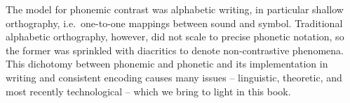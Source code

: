 The model for phonemic contrast was alphabetic writing, in particular shallow orthography, i.e.\ one-to-one mappings between sound and symbol. Traditional alphabetic orthography, however, did not scale to precise phonetic notation, so the former was sprinkled with diacritics to denote non-contrastive phenomena. This dichotomy between phonemic and phonetic and its implementation in writing and consistent encoding causes many issues -- linguistic, theoretic, and most recently technological -- which we bring to light in this book.
